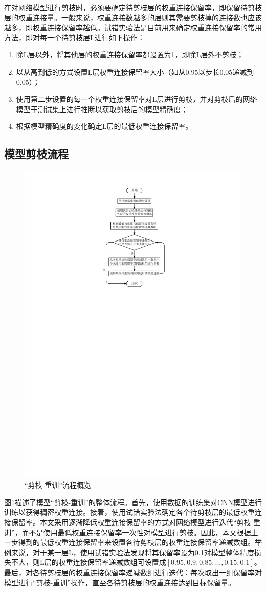 在对网络模型进行剪枝时，必须要确定待剪枝层的权重连接保留率，即保留待剪枝层的权重连接量。一般来说，权重连接数越多的层则其需要剪枝掉的连接数也应该越多，即权重连接保留率越低。试错实验法是目前用来确定权重连接保留率的常用方法，即对每一个待剪枝层L进行如下操作：
\begin{enumerate}
  \item 除L层以外，将其他层的权重连接保留率都设置为1，即除L层外不剪枝；
  \item 以从高到低的方式设置L层权重连接保留率大小（如从0.95以步长0.05递减到0.05）；
  \item 使用第二步设置的每一个权重连接保留率对L层进行剪枝，并对剪枝后的网络模型于测试集上进行推断以获取剪枝后的模型精确度；
  \item 根据模型精确度的变化确定L层的最低权重连接保留率。
\end{enumerate}


\subsection{模型剪枝流程}

\begin{figure}[htbp]
    \centering
    \includegraphics[height=0.8\textwidth]{figures/prune.pdf}
    \caption{“剪枝-重训”流程概览}\label{figure:figure20}
\end{figure}

图\ref{figure:figure20}描述了模型“剪枝-重训”的整体流程。首先，使用数据的训练集对CNN模型进行训练以获得稠密权重连接。接着，使用试错实验法确定各个待剪枝层的最低权重连接保留率。本文采用逐渐降低权重连接保留率的方式对网络模型进行迭代“剪枝-重训”，而不是使用最低权重连接保留率一次性对模型进行剪枝。因此，本文根据上一步得到的最低权重连接保留率来设置各待剪枝层的权重连接保留率递减数组。举例来说，对于某一层L，使用试错实验法发现将其保留率设为0.1对模型整体精度损失不大，则L层的权重连接保留率递减数组可设置成$[0.95,0.9,0.85,...,0.15,0.1]$。最后，对各待剪枝层的权重连接保留率递减数组进行迭代：每次取出一组保留率对模型进行“剪枝-重训”操作，直至各待剪枝层的权重连接达到目标保留量。

